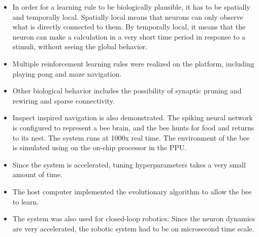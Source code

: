 \documentclass[12pt, letterpaper]{article}
\begin{document}
\begin{itemize}
    \item In order for a learning rule to be biologically plausible, it has to be spatially and temporally local. Spatially local means that neurons can only observe what is directly connected to them. By temporally local, it means that the neuron can make a calculation in a very short time period in response to a stimuli, without seeing the global behavior.
    \item Multiple reinforcement learning rules were realized on the platform, including playing pong and maze navigation.
    \item Other biological behavior includes the possibility of synaptic pruning and rewiring and sparse connectivity.
    \item Inspect inspired navigation is also demonstrated. The spiking neural network is configured to represent a bee brain, and the bee hunts for food and returns to its nest. The system runs at 1000x real time. The environment of the bee is simulated using on the on-chip processor in the PPU. 
    \item Since the system is accelerated, tuning hyperparameters takes a very small amount of time.
    \item The host computer implemented the evolutionary algorithm to allow the bee to learn.
    \item The system was also used for closed-loop robotics. Since the neuron dynamics are very accelerated, the robotic system had to be on microsecond time scale.
\end{itemize}
\end{document}
